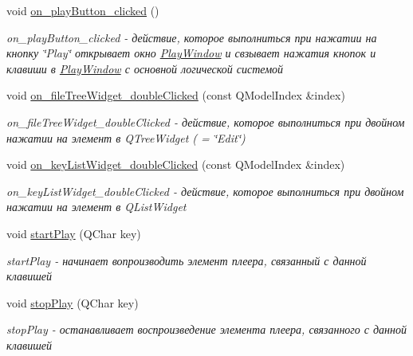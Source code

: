 \begin{DoxyCompactItemize}
\mbox{\label{class_key_main_window_a0b13e5083f4da72a98d710e0f1f41878}} 
void \hyperlink{class_key_main_window_a0b13e5083f4da72a98d710e0f1f41878}{on\+\_\+play\+Button\+\_\+clicked} ()
\begin{DoxyCompactList}\small\item\em on\+\_\+play\+Button\+\_\+clicked -\/ действие, которое выполниться при нажатии на кнопку \char`\"{}\+Play\char`\"{} открывает окно \hyperlink{class_play_window}{Play\+Window} и свзывает нажатия кнопок и клавиши в \hyperlink{class_play_window}{Play\+Window} с основной логической системой \end{DoxyCompactList}\item 
void \hyperlink{class_key_main_window_a13f36481d6b0d1f68dceca8a1c1ec2c1}{on\+\_\+file\+Tree\+Widget\+\_\+double\+Clicked} (const Q\+Model\+Index \&index)
\begin{DoxyCompactList}\small\item\em on\+\_\+file\+Tree\+Widget\+\_\+double\+Clicked -\/ действие, которое выполниться при двойном нажатии на элемент в Q\+Tree\+Widget ( = \char`\"{}\+Edit\char`\"{}) \end{DoxyCompactList}\item 
void \hyperlink{class_key_main_window_af82eadd35c704bc554d2465554dc48c0}{on\+\_\+key\+List\+Widget\+\_\+double\+Clicked} (const Q\+Model\+Index \&index)
\begin{DoxyCompactList}\small\item\em on\+\_\+key\+List\+Widget\+\_\+double\+Clicked -\/ действие, которое выполниться при двойном нажатии на элемент в Q\+List\+Widget \end{DoxyCompactList}\item 
void \hyperlink{class_key_main_window_a7a7856ea2f3e6d5bc6c4411057e64957}{start\+Play} (Q\+Char key)
\begin{DoxyCompactList}\small\item\em start\+Play -\/ начинает вопроизводить элемент плеера, связанный с данной клавишей \end{DoxyCompactList}\item 
void \hyperlink{class_key_main_window_a545142222ff293b73d57fb22ac6a122d}{stop\+Play} (Q\+Char key)
\begin{DoxyCompactList}\small\item\em stop\+Play -\/ останавливает воспроизведение элемента плеера, связанного с данной клавишей \end{DoxyCompactList}\item 

\end{DoxyCompactItemize}
